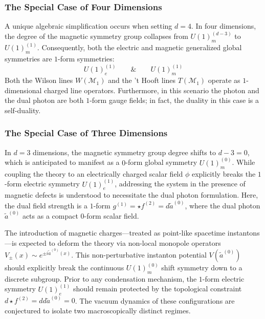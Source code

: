 \documentclass[aps,preprint,nofootinbib,preprintnumbers,eqsecnum,superscriptaddress]{revtex4}
\numberwithin{equation}{section}
\begin{document}
\subsubsection{The Special Case of Four Dimensions}
\label{subsec:four_dimensions}

A unique algebraic simplification occurs when setting $d=4$. In four dimensions, the degree of the magnetic symmetry group collapses from $U(1)^{(d-3)}_m$ to $U(1)^{(1)}_m$. Consequently, both the electric and magnetic generalized global symmetries are $1$-form symmetries:
\begin{equation}
U(1)_e^{(1)} \qquad \& \qquad U(1)^{(1)}_m
\end{equation}
Both the Wilson lines $W(\mathcal{M}_1)$ and the 't Hooft lines $T(\mathcal{M}_{1})$ operate as $1$-dimensional charged line operators. 
Furthermore, in this scenario the photon and the dual photon are both $1$-form gauge fields; in fact, the duality in this case is a self-duality.

\subsubsection{The Special Case of Three Dimensions}
\label{subsec:three_dimensions}
In $d=3$ dimensions, the magnetic symmetry group degree shifts to $d-3 = 0$, which is anticipated to manifest as a $0$-form global symmetry $U(1)_m^{(0)}$. While coupling the theory to an electrically charged scalar field $\phi$ explicitly breaks the $1$-form electric symmetry $U(1)_e^{(1)}$, addressing the system in the presence of magnetic defects is understood to necessitate the dual photon formulation. Here, the dual field strength is a $1$-form $g^{(1)} = \star f^{(2)} = d\tilde{a}^{(0)}$, where the dual photon $\tilde{a}^{(0)}$ acts as a compact $0$-form scalar field.

The introduction of magnetic charges—treated as point-like spacetime instantons—is expected to deform the theory via non-local monopole operators $V_{\pm}(x) \sim e^{\pm i \tilde{a}^{(0)}(x)}$. This non-perturbative instanton potential $V(\tilde{a}^{(0)})$ should explicitly break the continuous $U(1)_m^{(0)}$ shift symmetry down to a discrete subgroup. Prior to any condensation mechanism, the $1$-form electric symmetry $U(1)_e^{(1)}$ should remain protected by the topological constraint $d \star f^{(2)} = d d\tilde{a}^{(0)} = 0$. The vacuum dynamics of these configurations are conjectured to isolate two macroscopically distinct regimes.
\end{document}

